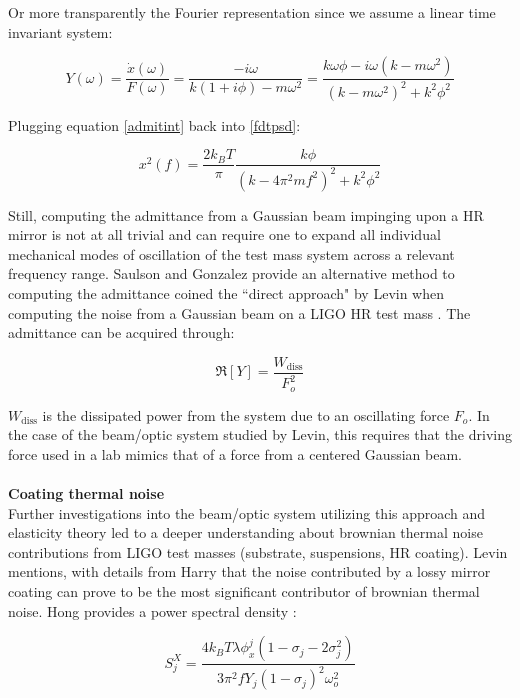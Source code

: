 \noindent Or more transparently the Fourier representation since we assume a linear time invariant system:

\begin{equation}\label{admitint}
Y(\omega) = \frac{\dot{x}(\omega)}{F(\omega)} = \frac{-i\omega}{k(1+i\phi) - m\omega^2} = \frac{k \omega \phi - i \omega (k - m \omega^2)}{(k-m\omega^2)^2 +k^2 \phi^2}
\end{equation}

\noindent Plugging equation \ref{admitint} back into \ref{fdtpsd}:

\begin{equation}
x^2 (f)  = \frac{2k_B T}{\pi}\frac{k\phi}{(k-4\pi^2 m f^2)^2 + k^2 \phi^2}
\end{equation}

\noindent Still, computing the admittance from a Gaussian beam impinging upon a HR mirror is not at all trivial and can require one to expand all individual mechanical modes of oscillation of the test mass system across a relevant frequency range. Saulson and Gonzalez provide an alternative method to computing the admittance coined the ``direct approach" by Levin when computing the noise from a Gaussian beam on a LIGO HR test mass \cite{levin:1998}. The admittance can be acquired through:

\begin{equation}
\Re[Y] = \frac{W_\mathrm{diss}}{F_o^2}
\end{equation}

\noindent $W_\mathrm{diss}$ is the dissipated power from the system due to an oscillating force $F_o$. In the case of the beam/optic system studied by Levin, this requires that the driving force used in a lab mimics that of a force from a centered Gaussian beam.
\\
\\
\noindent \textbf{Coating thermal noise}
\\
Further investigations into the beam/optic system utilizing this approach and elasticity theory led to a deeper understanding about brownian thermal noise contributions from LIGO test masses (substrate, suspensions, HR coating). Levin mentions, with details from Harry that the noise contributed by a lossy mirror coating can prove to be the most significant contributor of brownian thermal noise. Hong provides a power spectral density \cite{Hong:2013}:

\begin{equation}
S_j^X = \frac{4k_B T \lambda \phi_x^j(1- \sigma_j - 2 \sigma_j^2)}{3 \pi^2 f Y_j (1-\sigma_j)^2 \omega_o^2}
\end{equation}

